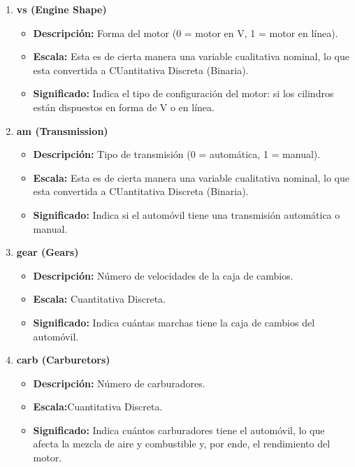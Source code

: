 \documentclass{article}
\begin{document}
\begin{enumerate}
    \item \textbf{vs (Engine Shape)}

          \begin{itemize}
              \item \textbf{Descripción:} Forma del motor (0 = motor en V, 1 = motor en línea).
              \item \textbf{Escala:}  Esta es de cierta manera una variable cualitativa nominal, lo que esta convertida a CUantitativa Discreta (Binaria).
              \item \textbf{Significado:} Indica el tipo de configuración del motor: si los cilindros están dispuestos en forma de V o en línea.
          \end{itemize}

    \item \textbf{am (Transmission)}

          \begin{itemize}
              \item \textbf{Descripción:} Tipo de transmisión (0 = automática, 1 = manual).
              \item \textbf{Escala:} Esta es de cierta manera una variable cualitativa nominal, lo que esta convertida a CUantitativa Discreta (Binaria).
              \item \textbf{Significado:} Indica si el automóvil tiene una transmisión automática o manual.
          \end{itemize}

    \item \textbf{gear (Gears)}

          \begin{itemize}
              \item \textbf{Descripción:} Número de velocidades de la caja de cambios.
              \item \textbf{Escala:} Cuantitativa Discreta.
              \item \textbf{Significado:} Indica cuántas marchas tiene la caja de cambios del automóvil.
          \end{itemize}

    \item \textbf{carb (Carburetors)}

          \begin{itemize}
              \item \textbf{Descripción:} Número de carburadores.
              \item \textbf{Escala:}Cuantitativa Discreta.
              \item \textbf{Significado:} Indica cuántos carburadores tiene el automóvil, lo que afecta la mezcla de aire y combustible y, por ende, el rendimiento del motor.
          \end{itemize}

\end{enumerate}
\end{document}
